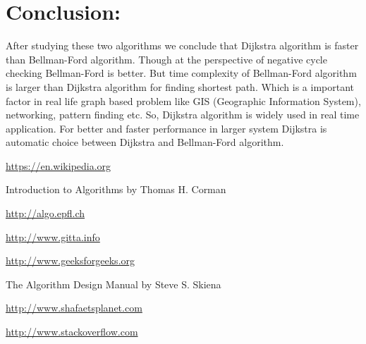 \documentclass[a4paper,10pt]{article}
\begin{document}
\section{Conclusion:}
After studying these two algorithms we conclude that Dijkstra algorithm is faster than Bellman-Ford algorithm. Though at the perspective of negative cycle checking Bellman-Ford is better. But time complexity of Bellman-Ford algorithm is larger than Dijkstra algorithm for finding shortest path. Which is a important factor in real life graph based problem like GIS (Geographic Information System), networking, pattern finding etc. So, Dijkstra algorithm is widely used in real time application. For better and faster performance in larger system Dijkstra is automatic choice between Dijkstra and Bellman-Ford algorithm.\\

\begin{thebibliography}{10}

\vspace{.1cm}

\newblock \url{https://en.wikipedia.org}

Introduction to Algorithms by Thomas H. Corman

\newblock \url{http://algo.epfl.ch}

\newblock \url{http://www.gitta.info}

\newblock \url{http://www.geeksforgeeks.org}

The Algorithm Design Manual by Steve S. Skiena

\newblock \url{http://www.shafaetsplanet.com}


\newblock \url{http://www.stackoverflow.com}


\end{thebibliography}
\end{document}
